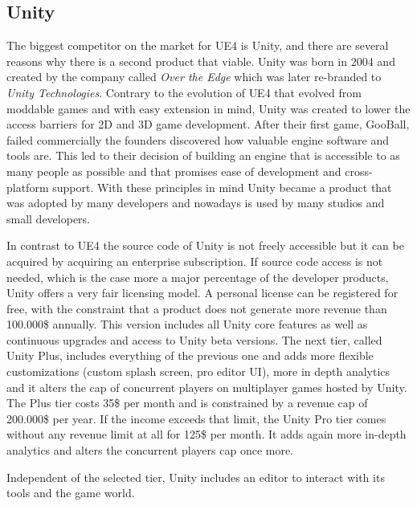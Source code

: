 \subsection{Unity}

The biggest competitor on the market for \ac{UE4} is Unity, and there are several reasons why there is a second product that viable. Unity was born in 2004 and created by the company called \textit{Over the Edge} which was later re-branded to \textit{Unity Technologies}. Contrary to the evolution of \ac{UE4} that evolved from moddable games and with easy extension in mind, Unity was created to lower the access barriers for 2D and 3D game development. After their first game, GooBall, failed commercially the founders discovered how valuable engine software and tools are. This led to their decision of building an engine that is accessible to as many people as possible and that promises ease of development and cross-platform support. With these principles in mind Unity became a product that was adopted by many developers and nowadays is used by many studios and small developers.

In contrast to \ac{UE4} the source code of Unity is not freely accessible but it can be acquired by acquiring an enterprise subscription. If source code access is not needed, which is the case more a major percentage of the developer products, Unity offers a very fair licensing model. A personal license can be registered for free, with the constraint that a product does not generate more revenue than 100.000\$ annually. This version includes all Unity core features as well as continuous upgrades and access to Unity beta versions. The next tier, called Unity Plus, includes everything of the previous one and adds more flexible customizations (custom splash screen, pro editor UI), more in depth analytics and it alters the cap of concurrent players on multiplayer games hosted by Unity. The Plus tier costs 35\$ per month and is constrained by a revenue cap of 200.000\$ per year. If the income exceeds that limit, the Unity Pro tier comes without any revenue limit at all for 125\$ per month. It adds again more in-depth analytics and alters the concurrent players cap once more.

Independent of the selected tier, Unity includes an editor to interact with its tools and the game world. 

